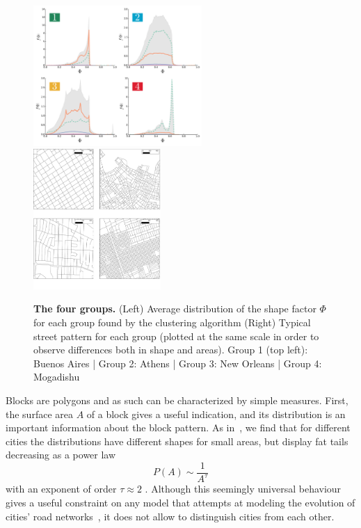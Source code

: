 \begin{figure}
    \center
    \includegraphics[height=2.1in]{./gfx/chapter-networks/groups.pdf}
    \includegraphics[height=2.1in]{./gfx/chapter-networks/groups_patterns.pdf}
    \caption{{\bf The four groups.} (Left) Average distribution of the shape
    factor $\Phi$ for each group found by the clustering algorithm (Right) Typical
    street pattern for each group (plotted at the same scale in order to observe
    differences both in shape and areas). Group 1 (top left): Buenos Aires | Group
    2: Athens | Group 3: New Orleans | Group 4: Mogadishu \label{fig:groups}}
\end{figure}

Blocks are polygons and as such can be characterized by simple measures. First,
the surface area $A$ of a block gives a useful indication, and its distribution
is an important information about the block pattern. As
in~\cite{Lammer:2006,Fialkowski:2008}, we find that for different cities the
distributions have different shapes for small areas, but display fat tails
decreasing as a power law \begin{equation} P(A)\sim \frac{1}{A^\tau}
\end{equation} with an exponent of order $\tau\approx 2$
\cite{Lammer:2006,Barthelemy:2011,Strano:2012,Barthelemy:2013,frag:2014}.
Although this seemingly universal behaviour gives a useful constraint on any
model that attempts at modeling the evolution of cities' road
networks~\cite{frag:2014}, it does not allow to distinguish cities from each
other.


